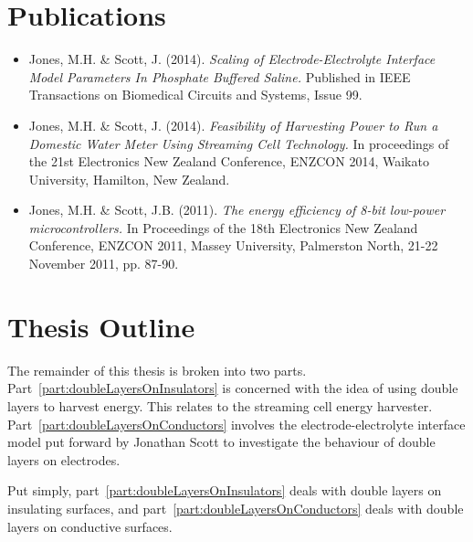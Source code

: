\section{Publications}

  \begin{itemize}
    \item Jones, M.H. \& Scott, J. (2014). \emph{Scaling of Electrode-Electrolyte Interface Model Parameters In Phosphate Buffered Saline.} Published in IEEE Transactions on Biomedical Circuits and Systems, Issue 99.
    \item Jones, M.H. \& Scott, J. (2014). \emph{Feasibility of Harvesting Power to Run a Domestic Water Meter Using Streaming Cell Technology.} In proceedings of the 21st Electronics New Zealand Conference, ENZCON 2014, Waikato University, Hamilton, New Zealand.
    \item Jones, M.H. \& Scott, J.B. (2011). \emph{The energy efficiency of 8-bit low-power microcontrollers.} In Proceedings of the 18th Electronics New Zealand Conference, ENZCON 2011, Massey University, Palmerston North, 21-22 November 2011, pp. 87-90.
  \end{itemize}

\section{Thesis Outline}
  
  The remainder of this thesis is broken into two parts.
  Part~\ref{part:doubleLayersOnInsulators} is concerned with the idea of using double layers to harvest energy.
  This relates to the streaming cell energy harvester.
  Part~\ref{part:doubleLayersOnConductors} involves the electrode-electrolyte interface model put forward by Jonathan Scott to investigate the behaviour of double layers on electrodes.

  Put simply, part~\ref{part:doubleLayersOnInsulators} deals with double layers on insulating surfaces, and part~\ref{part:doubleLayersOnConductors} deals with double layers on conductive surfaces.

  
